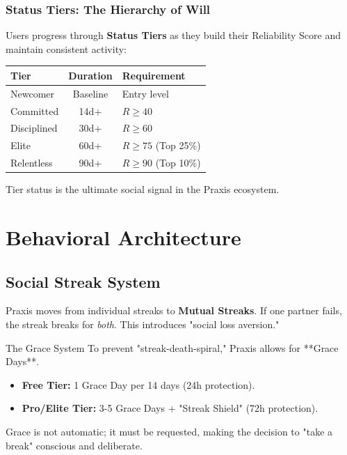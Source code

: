 \documentclass[11pt,a4paper,oneside]{article}
\begin{document}
\subsubsection{Status Tiers: The Hierarchy of Will}
Users progress through \textbf{Status Tiers} as they build their Reliability Score and maintain consistent activity:
\begin{center}
\begin{tabular}{lcl}
\toprule
\textbf{Tier} & \textbf{Duration} & \textbf{Requirement} \\
\midrule
Newcomer & Baseline & Entry level \\
Committed & 14d+ & $R \geq 40$ \\
Disciplined & 30d+ & $R \geq 60$ \\
Elite & 60d+ & $R \geq 75$ (Top 25\%) \\
Relentless & 90d+ & $R \geq 90$ (Top 10\%) \\
\bottomrule
\end{tabular}
\end{center}
Tier status is the ultimate social signal in the Praxis ecosystem.

\section{Behavioral Architecture}

\subsection{Social Streak System}
Praxis moves from individual streaks to \textbf{Mutual Streaks}. If one partner fails, the streak breaks for \textit{both}. This introduces "social loss aversion."

\begin{callout}{The Grace System}
To prevent "streak-death-spiral," Praxis allows for **Grace Days**. 
\begin{itemize}
    \item \textbf{Free Tier:} 1 Grace Day per 14 days (24h protection).
    \item \textbf{Pro/Elite Tier:} 3-5 Grace Days + "Streak Shield" (72h protection).
\end{itemize}
Grace is not automatic; it must be requested, making the decision to "take a break" conscious and deliberate.
\end{callout}
\end{document}
